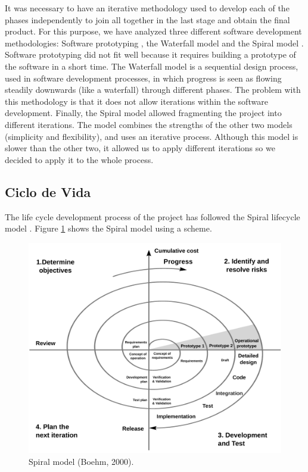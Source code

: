 It was necessary to have an iterative methodology used to develop each of the phases independently to join all together in the last stage and obtain the final product. For this purpose, we have analyzed three different software development methodologies: Software prototyping \cite{grimm1998}, the Waterfall model \cite{hebert1983} and the Spiral model \cite{boehm1988}. Software prototyping did not fit well because it requires building a prototype of the software in a short time. The Waterfall model is a sequential design process, used in software development processes, in which progress is seen as flowing steadily downwards (like a waterfall) through different phases. The problem with this methodology is that it does not allow iterations within the software development. Finally, the Spiral model allowed fragmenting the project into different iterations. The model combines the strengths of the other two models (simplicity and flexibility), and uses an iterative process. Although this model is slower than the other two, it allowed us to apply different iterations so we decided to apply it to the whole process.

\subsection{Ciclo de Vida}

The life cycle development process of the project has followed the Spiral lifecycle model \cite{boehm1988}. Figure \ref{fig:spiral_model} shows the Spiral model using a scheme.

\begin{figure}[htbp]
 	\centering
 	\includegraphics[width=12cm]{figures/spiral_model}
 	\caption{Spiral model (Boehm, 2000).}
	\label{fig:spiral_model}
\end{figure}


